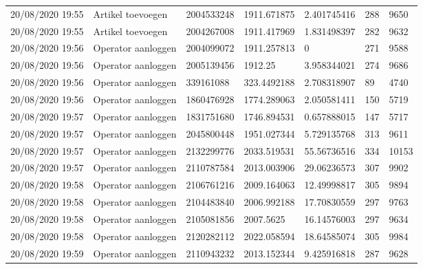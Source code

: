 \begin{tiny}
\begin{longtable}{lllllll}
    20/08/2020 19:55 & Artikel toevoegen     & 2004533248        & 1911.671875 & 2.401745416           & 288              & 9650             \\
    20/08/2020 19:55 & Artikel toevoegen     & 2004267008        & 1911.417969 & 1.831498397           & 282              & 9632             \\
    20/08/2020 19:56 & Operator aanloggen    & 2004099072        & 1911.257813 & 0                     & 271              & 9588             \\
    20/08/2020 19:56 & Operator aanloggen    & 2005139456        & 1912.25     & 3.958344021           & 274              & 9686             \\
    20/08/2020 19:56 & Operator aanloggen    & 339161088         & 323.4492188 & 2.708318907           & 89               & 4740             \\
    20/08/2020 19:56 & Operator aanloggen    & 1860476928        & 1774.289063 & 2.050581411           & 150              & 5719             \\
    20/08/2020 19:57 & Operator aanloggen    & 1831751680        & 1746.894531 & 0.657888015           & 147              & 5717             \\
    20/08/2020 19:57 & Operator aanloggen    & 2045800448        & 1951.027344 & 5.729135768           & 313              & 9611             \\
    20/08/2020 19:57 & Operator aanloggen    & 2132299776        & 2033.519531 & 55.56736516           & 334              & 10153            \\
    20/08/2020 19:57 & Operator aanloggen    & 2110787584        & 2013.003906 & 29.06236573           & 307              & 9902             \\
    20/08/2020 19:58 & Operator aanloggen    & 2106761216        & 2009.164063 & 12.49998817           & 305              & 9894             \\
    20/08/2020 19:58 & Operator aanloggen    & 2104483840        & 2006.992188 & 17.70830559           & 297              & 9763             \\
    20/08/2020 19:58 & Operator aanloggen    & 2105081856        & 2007.5625   & 16.14576003           & 297              & 9634             \\
    20/08/2020 19:58 & Operator aanloggen    & 2120282112        & 2022.058594 & 18.64585074           & 305              & 9984             \\
    20/08/2020 19:59 & Operator aanloggen    & 2110943232        & 2013.152344 & 9.425916818           & 287              & 9628             \\

\end{longtable}
\end{tiny}
